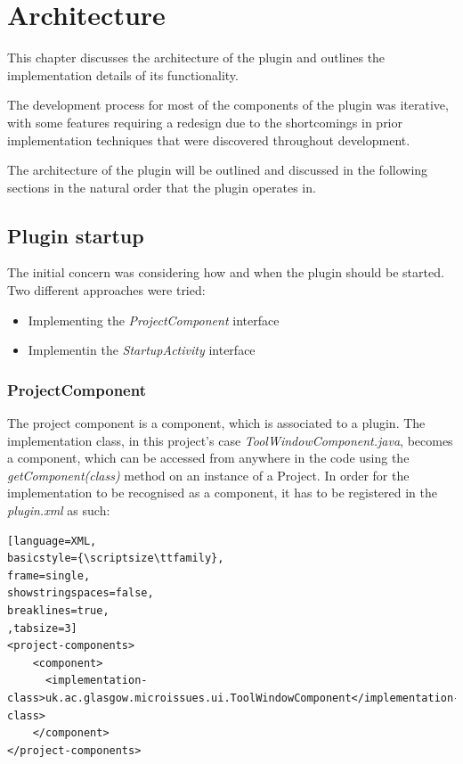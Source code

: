 \documentclass{4thYearProject}
\begin{document}
\chapter{Architecture}

This chapter discusses the architecture of the plugin and outlines the implementation details of its functionality.

The development process for most of the components of the plugin was iterative, with some features requiring a redesign due to the shortcomings in prior implementation techniques that were discovered throughout development. 

The architecture of the plugin will be outlined and discussed in the following sections in the natural order that the plugin operates in. 

\section{Plugin startup}

The initial concern was considering how and when the plugin should be started. Two different approaches were tried:
\begin{itemize}
\item Implementing the \textit{ProjectComponent} interface  
\item Implementin the \textit{StartupActivity} interface 
\end{itemize}

\subsection{ProjectComponent}

The project component is a component, which is associated to a plugin. The implementation class, in this project's case \textit{ToolWindowComponent.java}, becomes a component, which can be accessed from anywhere in the code using the \textit{getComponent(class)} method on an instance of a Project. In order for the implementation to be recognised as a component, it has to be registered in the \textit{plugin.xml} as such:\\

\begin{lstlisting}[language=XML, 
basicstyle={\scriptsize\ttfamily}, 
frame=single,
showstringspaces=false,
breaklines=true,
,tabsize=3]
<project-components>
    <component>
      <implementation-class>uk.ac.glasgow.microissues.ui.ToolWindowComponent</implementation-class>
    </component>
</project-components>
\end{lstlisting}
\end{document}
